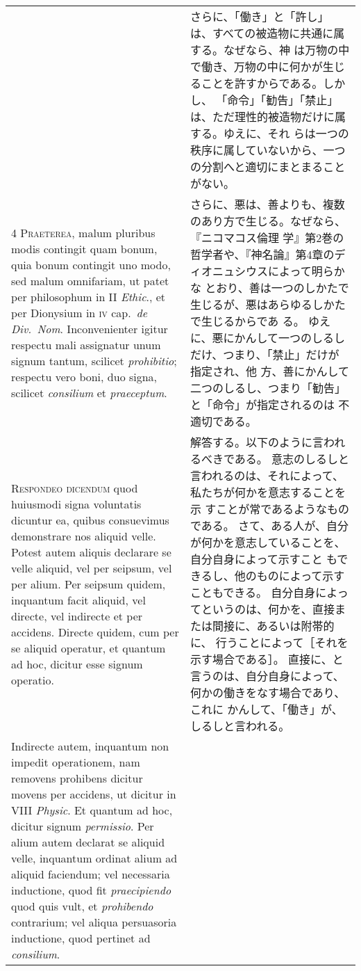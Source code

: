 \documentclass[10pt]{jsarticle} %
\begin{document}
\begin{longtable}{p{21em}p{21em}}
&

さらに、「働き」と「許し」は、すべての被造物に共通に属する。なぜなら、神
 は万物の中で働き、万物の中に何かが生じることを許すからである。しかし、
 「命令」「勧告」「禁止」は、ただ理性的被造物だけに属する。ゆえに、それ
 らは一つの秩序に属していないから、一つの分割へと適切にまとまることがない。

\\


{\scshape 4 Praeterea}, malum pluribus modis contingit
quam bonum, quia bonum contingit uno modo, sed malum omnifariam, ut
patet per philosophum in II {\itshape Ethic}., et per Dionysium in {\scshape iv} cap.~{\itshape de
Div.~Nom}. Inconvenienter igitur respectu mali assignatur unum signum
tantum, scilicet {\itshape prohibitio}; respectu vero boni, duo signa, scilicet
{\itshape consilium} et {\itshape praeceptum}.


&


さらに、悪は、善よりも、複数のあり方で生じる。なぜなら、『ニコマコス倫理
 学』第2巻の哲学者や、『神名論』第4章のディオニュシウスによって明らかな
 とおり、善は一つのしかたで生じるが、悪はあらゆるしかたで生じるからであ
 る。
ゆえに、悪にかんして一つのしるしだけ、つまり、「禁止」だけが指定され、他
 方、善にかんして二つのしるし、つまり「勧告」と「命令」が指定されるのは
 不適切である。

\\


{\scshape Respondeo dicendum} quod huiusmodi signa
voluntatis dicuntur ea, quibus consuevimus demonstrare nos aliquid
velle. Potest autem aliquis declarare se velle aliquid, vel per seipsum,
vel per alium. Per seipsum quidem, inquantum facit aliquid, vel directe,
vel indirecte et per accidens. Directe quidem, cum per se aliquid
operatur, et quantum ad hoc, dicitur esse signum operatio. 


&

解答する。以下のように言われるべきである。
意志のしるしと言われるのは、それによって、私たちが何かを意志することを示
 すことが常であるようなものである。
さて、ある人が、自分が何かを意志していることを、自分自身によって示すこと
 もできるし、他のものによって示すこともできる。
自分自身によってというのは、何かを、直接または間接に、あるいは附帯的に、
 行うことによって［それを示す場合である］。
直接に、と言うのは、自分自身によって、何かの働きをなす場合であり、これに
 かんして、「働き」が、しるしと言われる。

\\


Indirecte
autem, inquantum non impedit operationem, nam removens prohibens dicitur
movens per accidens, ut dicitur in VIII {\itshape Physic}. Et quantum ad hoc,
dicitur signum {\itshape permissio}. Per alium autem declarat se aliquid velle,
inquantum ordinat alium ad aliquid faciendum; vel necessaria inductione,
quod fit {\itshape praecipiendo} quod quis vult, et {\itshape prohibendo} contrarium; vel
aliqua persuasoria inductione, quod pertinet ad {\itshape consilium}. 



\end{longtable}
\end{document}
